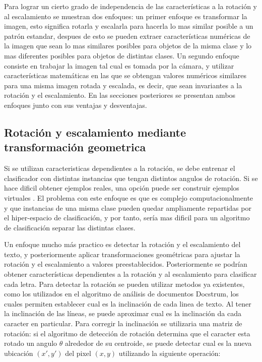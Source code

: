 \documentclass[a4paper, 11pt, oneside]{report}
\begin{document}
Para lograr un cierto grado de independencia de las características a la rotación y al escalamiento se muestran dos enfoques: un primer enfoque es transformar la imagen, esto significa rotarla y escalarla para hacerla lo mas similar posible a un patrón estandar, despues de esto se pueden extraer características numéricas de la imagen que sean lo mas similares posibles para objetos de la misma clase y lo mas diferentes posibles para objetos de distintas clases. Un segundo enfoque consiste en trabajar la imagen tal cual es tomada por la cámara, y utilizar características matemáticas en las que se obtengan valores numéricos similares para una misma imagen rotada y escalada, es decir, que sean invariantes a la rotación y el escalamiento. En las secciones posteriores se presentan ambos enfoques junto con sus ventajas y desventajas.

\subsection{Rotación y escalamiento mediante transformación geometrica}
\label{sect:rotation}

Si se utilizan caracteristicas dependientes a la rotación, se debe entrenar el clasificador con distintas instancias que tengan distintos angulos de rotación. Si se hace dificil obtener ejemplos reales, una opción puede ser construir ejemplos virtuales \cite{niyogi2002}. El problema con este enfoque es que es complejo computacionalmente y que instancias de una misma clase pueden quedar ampliamente repartidas por el hiper-espacio de clasificación, y por tanto, sería mas dificil para un algoritmo de clasificación separar las distintas clases.

Un enfoque mucho más practico es detectar la rotación y el escalamiento del texto, y posteriormente aplicar transformaciones geométricas para ajustar la rotación y el escalamiento a valores preestablecidos. Posteriormente se podrían obtener características dependientes a la rotación y al escalamiento para clasificar cada letra. Para detectar la rotación se pueden utilizar metodos ya existentes, como los utilizados en el algoritmo de análisis de documentos Docstrum, los cuales permiten establecer cual es la inclinación de cada linea de texto. Al tener la inclinación de las líneas, se puede aproximar cual es la inclinación da cada caracter en particular. Para corregir la inclinación se utilizaria una matriz de rotación: si el algoritmo de detección de rotación determina que el caracter esta rotado un angulo $\theta$ alrededor de su centroide, se puede detectar cual es la nueva ubicación $(x', y')$ del pixel $(x, y)$ utilizando la siguiente operación:
\end{document}
